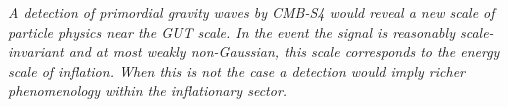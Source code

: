 {\it A detection of primordial gravity waves by CMB-S4 would reveal a new scale of particle physics near the GUT scale. In the event the signal is reasonably scale-invariant and at most weakly non-Gaussian, this scale corresponds to the energy scale of inflation. When this is not the case a detection would imply richer phenomenology within the inflationary sector.}


%
